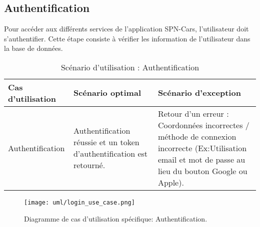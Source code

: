\subsection{Authentification}
Pour accéder aux différents services de l'application SPN-Cars, l'utilisateur doit s'authentifier. Cette étape consiste à vérifier les information de l'utilisateur dans la base de données.
\begin{table}[H]
    \begin{center}
        \begin{tabularx}{\textwidth} {
                | >{\centering\arraybackslash}X
                | >{\centering\arraybackslash}X
                | >{\centering\arraybackslash}X |}
            \hline
            Cas d'utilisation & Scénario optimal                                                      & Scénario d'exception                                                                                                                                     \\
            \hline
            Authentification  & Authentification réussie et un token d'authentification est retourné. & Retour d'un erreur : Coordonnées incorrectes / méthode de connexion incorrecte (Ex:Utilisation email et mot de passe au lieu du bouton Google ou Apple). \\
            \hline
        \end{tabularx}
        \captionsetup{justification=centering}
        \caption{Scénario d'utilisation : Authentification}
        \label{tab:login_scenario}
    \end{center}
\end{table}
\vspace{1cm}
\begin{figure}[H]
    \centering
    \texttt{[image: uml/login\_use\_case.png]}
    \vspace{1cm}
    \captionsetup{justification=centering}
    \caption{Diagramme de cas d'utilisation spécifique: Authentification.}
    \label{fig:use_case_login}
\end{figure}
